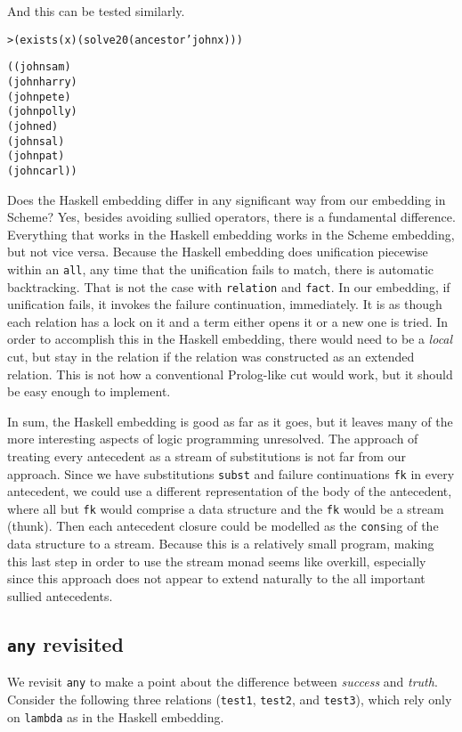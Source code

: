 \noindent
And this can be tested similarly.
\begin{alltt}
> (exists (x) (solve 20 (ancestor 'john x)))

((john sam)
 (john harry)
 (john pete)
 (john polly)
 (john ed)
 (john sal)
 (john pat)
 (john carl))
\end{alltt}

Does the Haskell embedding differ in any significant way from our
embedding in Scheme?  Yes, besides avoiding sullied operators, there
is a fundamental difference.  Everything that works in the Haskell
embedding works in the Scheme embedding, but not vice versa.  Because
the Haskell embedding does unification piecewise within an
\texttt{all}, any time that the unification fails to match, there is
automatic backtracking.  That is not the case with \texttt{relation}
and \texttt{fact}.  In our embedding, if unification fails, it invokes
the failure continuation, immediately.  It is as though each relation
has a lock on it and a term either opens it or a new one is tried.  In
order to accomplish this in the Haskell embedding, there would need to
be a \emph{local} cut, but stay in the relation if the relation was
constructed as an extended relation.  This is not how a conventional
Prolog-like cut would work, but it should be easy enough to implement.

In sum, the Haskell embedding is good as far as it goes, but it
leaves many of the more interesting aspects of logic programming
unresolved.  The approach of treating every antecedent as a stream
of substitutions is not far from our approach.  Since we have
substitutions \texttt{subst} and failure continuations \texttt{fk}
in every antecedent, we could use a different representation of the
body of the antecedent, where all but \texttt{fk} would comprise
a data structure and the \texttt{fk} would be a stream (thunk).
Then each antecedent closure could be modelled as the \texttt{cons}ing
of the data structure to a stream.  Because this is a relatively
small program, making this last step in order to use the stream
monad seems like overkill, especially since this approach does not
appear to extend naturally to the all important sullied antecedents.
\newpage
\subsection{\texttt{any} revisited}

We revisit \texttt{any} to make a point about the difference between
\emph{success} and \emph{truth}.  Consider the following three
relations (\texttt{test1}, \texttt{test2}, and \texttt{test3}), which
rely only on \texttt{lambda} as in the Haskell embedding.

